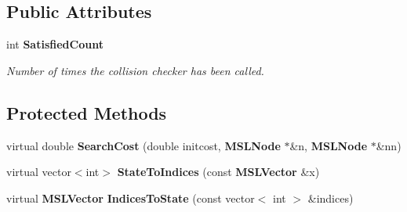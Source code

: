 \subsection*{Public Attributes}
\begin{CompactItemize}
\item 
int {\bf Satisfied\-Count}
\begin{CompactList}\small\item\em Number of times the collision checker has been called.\item\end{CompactList}\end{CompactItemize}
\subsection*{Protected Methods}
\begin{CompactItemize}
\item 
virtual double {\bf Search\-Cost} (double initcost, {\bf MSLNode} $\ast$\&n, {\bf MSLNode} $\ast$\&nn)
\item 
virtual vector$<$int$>$ {\bf State\-To\-Indices} (const {\bf MSLVector} \&x)
\item 
virtual {\bf MSLVector} {\bf Indices\-To\-State} (const vector$<$ int $>$ \&indices)
\end{CompactItemize}

